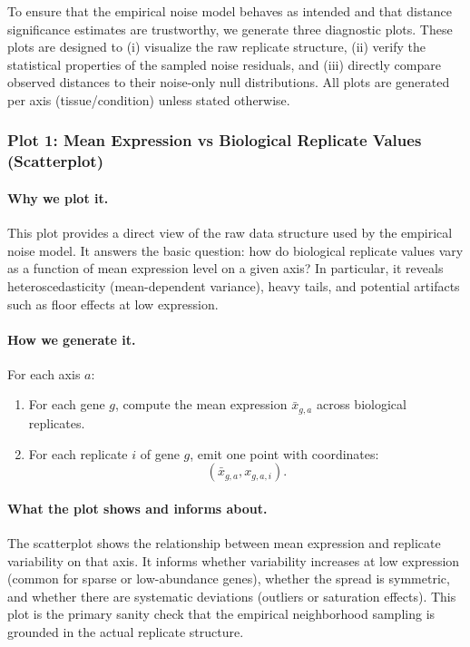 \documentclass{article}
\begin{document}
To ensure that the empirical noise model behaves as intended and that distance significance estimates are trustworthy, we generate three diagnostic plots. These plots are designed to (i) visualize the raw replicate structure, (ii) verify the statistical properties of the sampled noise residuals, and (iii) directly compare observed distances to their noise-only null distributions. All plots are generated per axis (tissue/condition) unless stated otherwise.

\subsubsection{Plot 1: Mean Expression vs Biological Replicate Values (Scatterplot)}

\paragraph{Why we plot it.}
This plot provides a direct view of the raw data structure used by the empirical noise model. It answers the basic question: how do biological replicate values vary as a function of mean expression level on a given axis? In particular, it reveals heteroscedasticity (mean-dependent variance), heavy tails, and potential artifacts such as floor effects at low expression.

\paragraph{How we generate it.}
For each axis $a$:
\begin{enumerate}
\item For each gene $g$, compute the mean expression $\bar{x}_{g,a}$ across biological replicates.
\item For each replicate $i$ of gene $g$, emit one point with coordinates:
\[
(\bar{x}_{g,a}, x_{g,a,i}).
\]
\end{enumerate}

\paragraph{What the plot shows and informs about.}
The scatterplot shows the relationship between mean expression and replicate variability on that axis. It informs whether variability increases at low expression (common for sparse or low-abundance genes), whether the spread is symmetric, and whether there are systematic deviations (outliers or saturation effects). This plot is the primary sanity check that the empirical neighborhood sampling is grounded in the actual replicate structure.
\end{document}
